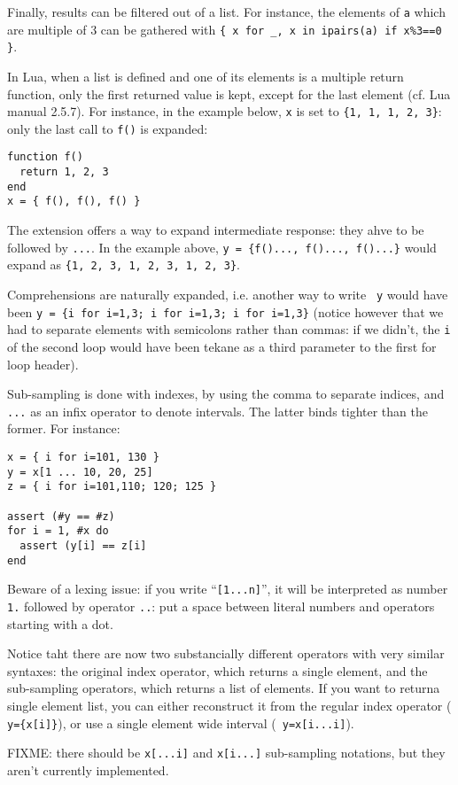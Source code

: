 Finally, results can be filtered out of a list. For instance, the
elements of {\tt a} which are multiple of 3 can be gathered with
{\tt\{ x for \_, x in ipairs(a) if x\%3==0 \}}.

In Lua, when a list is defined and one of its elements is a multiple
return function, only the first returned value is kept, except for the
last element (cf. Lua manual 2.5.7). For instance, in the example
below, {\tt x} is set to {\tt\{1, 1, 1, 2, 3\}}: only the last call to
{\tt f()} is expanded:

\begin{verbatim}
function f()
  return 1, 2, 3
end
x = { f(), f(), f() }
\end{verbatim}

The extension offers a way to expand intermediate response: they ahve
to be followed by {\tt...}. In the example above, {\tt y = \{f()...,
  f()..., f()...\}} would expand as {\tt\{1, 2, 3, 1, 2, 3, 1, 2,
  3\}}.

Comprehensions are naturally expanded, i.e. another way to write {\tt
  y} would have been {\tt y = \{i for i=1,3; i for i=1,3; i for
  i=1,3\}} (notice however that we had to separate elements with
semicolons rather than commas: if we didn't, the {\tt i} of the second
loop would have been tekane as a third parameter to the first for loop
header).

Sub-sampling is done with indexes, by using the comma to separate
indices, and {\tt...} as an infix operator to denote intervals. The
latter binds tighter than the former. For instance:

\begin{verbatim}
x = { i for i=101, 130 }
y = x[1 ... 10, 20, 25]
z = { i for i=101,110; 120; 125 }

assert (#y == #z)
for i = 1, #x do
  assert (y[i] == z[i]
end
\end{verbatim}

Beware of a lexing issue: if you write ``{\tt[1...n]}'', it will be
interpreted as number {\tt 1.} followed by operator {\tt..}: put a
space between literal numbers and operators starting with a dot.

Notice taht there are now two substancially different operators with
very similar syntaxes: the original index operator, which returns a
single element, and the sub-sampling operators, which returns a list
of elements. If you want to returna single element list, you can
either reconstruct it from the regular index operator ({\tt
  y=\{x[i]\}}), or use a single element wide interval ({\tt
  y=x[i...i]}).

FIXME: there should be \verb|x[...i]| and \verb|x[i...]| sub-sampling
notations, but they aren't currently implemented.